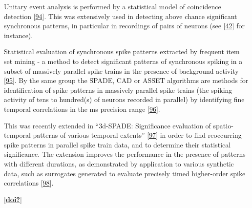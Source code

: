 Unitary event analysis is performed by a statistical model of coincidence detection {[}\protect\hyperlink{ref-13iJohyPk}{94}{]}. This was extensively used in detecting above chance significant synchronous patterns, in particular in recordings of pairs of neurons (see {[}\protect\hyperlink{ref-wVZpQvSk}{42}{]} for instance).

Statistical evaluation of synchronous spike patterns extracted by frequent item set mining - a method to detect significant patterns of synchronous spiking in a subset of massively parallel spike trains in the presence of background activity {[}\protect\hyperlink{ref-1ErNTONy0}{95}{]}. By the same group the SPADE, CAD or ASSET algorithms are methods for identification of spike patterns in massively parallel spike trains (the spiking activity of tens to hundred(s) of neurons recorded in parallel) by identifying fine temporal correlations in the ms precision range {[}\protect\hyperlink{ref-V9qkJFZU}{96}{]}.

This was recently extended in ``3d-SPADE: Significance evaluation of spatio-temporal patterns of various temporal extents'' {[}\protect\hyperlink{ref-pExXxdMb}{97}{]} in order to find reoccurring spike patterns in parallel spike train data, and to determine their statistical significance. The extension improves the performance in the presence of patterns with different durations, as demonstrated by application to various synthetic data, such as surrogates generated to evaluate precisely timed higher-order spike correlations {[}\protect\hyperlink{ref-d2m7wQpH}{98}{]}.

{[}\protect\hyperlink{ref-doi}{\textbf{doi?}}{]}

